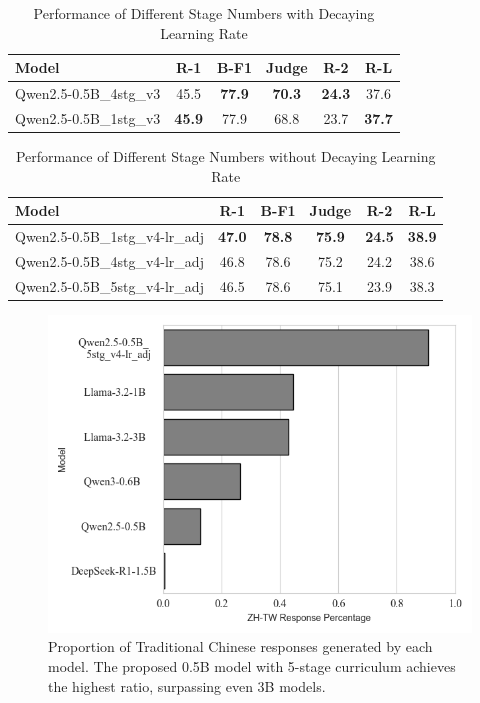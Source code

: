 \documentclass[preprint,12pt]{elsarticle}
\begin{document}
\begin{table}[t]
\centering
\begin{tabular}{lccccc}
\hline
Model & R-1 & B-F1 & Judge & R-2 & R-L \\
\hline
Qwen2.5-0.5B\_4stg\_v3 & 45.5 & \textbf{77.9} & \textbf{70.3} & \textbf{24.3} & 37.6 \\
Qwen2.5-0.5B\_1stg\_v3 & \textbf{45.9} & 77.9 & 68.8 & 23.7 & \textbf{37.7} \\
\hline
\end{tabular}
\caption{Performance of Different Stage Numbers with Decaying Learning Rate}\label{tab:stage_lr_decay}
\end{table}

\begin{table}[t]
\centering
\begin{tabular}{lccccc}
\hline
Model & R-1 & B-F1 & Judge & R-2 & R-L \\
\hline
Qwen2.5-0.5B\_1stg\_v4-lr\_adj & \textbf{47.0} & \textbf{78.8} & \textbf{75.9} & \textbf{24.5} & \textbf{38.9} \\
Qwen2.5-0.5B\_4stg\_v4-lr\_adj & 46.8 & 78.6 & 75.2 & 24.2 & 38.6 \\
Qwen2.5-0.5B\_5stg\_v4-lr\_adj & 46.5 & 78.6 & 75.1 & 23.9 & 38.3 \\
\hline
\end{tabular}
\caption{Performance of Different Stage Numbers without Decaying Learning Rate}\label{tab:stage_no_lr_decay}
\end{table}

\begin{figure}
\centering
\includegraphics[width=\textwidth]{figures/zh_tw_result_percentage_overall.png}
\caption{Proportion of Traditional Chinese responses generated by each model. The proposed 0.5B model with 5-stage curriculum achieves the highest ratio, surpassing even 3B models.}\label{fig:zh_tw_result}
\end{figure}
\end{document}
